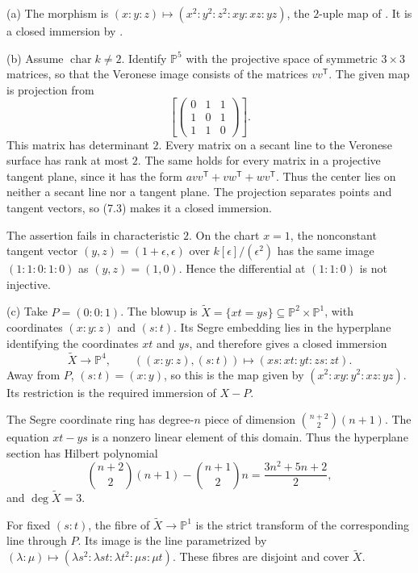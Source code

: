 (a) The morphism is $(x:y:z)\mapsto(x^2:y^2:z^2:xy:xz:yz)$, the $2$-uple map of . It is a closed immersion by .

(b) Assume $\operatorname{char}k\ne2$. Identify $\mathbb P^5$ with the projective space of symmetric $3\times3$ matrices, so that the Veronese image consists of the matrices $vv^{\mathsf T}$. The given map is projection from
\[\left[\begin{pmatrix}0&1&1\\1&0&1\\1&1&0\end{pmatrix}\right].\]
This matrix has determinant $2$. Every matrix on a secant line to the Veronese surface has rank at most $2$. The same holds for every matrix in a projective tangent plane, since it has the form $avv^{\mathsf T}+vw^{\mathsf T}+wv^{\mathsf T}$. Thus the center lies on neither a secant line nor a tangent plane. The projection separates points and tangent vectors, so (7.3) makes it a closed immersion.

The assertion fails in characteristic $2$. On the chart $x=1$, the nonconstant tangent vector $(y,z)=(1+\epsilon,\epsilon)$ over $k[\epsilon]/(\epsilon^2)$ has the same image $(1:1:0:1:0)$ as $(y,z)=(1,0)$. Hence the differential at $(1:1:0)$ is not injective.

(c) Take $P=(0:0:1)$. The blowup is $\widetilde X=\{xt=ys\}\subseteq\mathbb P^2\times\mathbb P^1$, with coordinates $(x:y:z)$ and $(s:t)$. Its Segre embedding lies in the hyperplane identifying the coordinates $xt$ and $ys$, and therefore gives a closed immersion
\[\widetilde X\to\mathbb P^4,\qquad ((x:y:z),(s:t))\mapsto(xs:xt:yt:zs:zt).\]
Away from $P$, $(s:t)=(x:y)$, so this is the map given by $(x^2:xy:y^2:xz:yz)$. Its restriction is the required immersion of $X-P$.

The Segre coordinate ring has degree-$n$ piece of dimension $\binom{n+2}{2}(n+1)$. The equation $xt-ys$ is a nonzero linear element of this domain. Thus the hyperplane section has Hilbert polynomial
\[\binom{n+2}{2}(n+1)-\binom{n+1}{2}n=\frac{3n^2+5n+2}{2},\]
and $\deg\widetilde X=3$.

For fixed $(s:t)$, the fibre of $\widetilde X\to\mathbb P^1$ is the strict transform of the corresponding line through $P$. Its image is the line parametrized by $(\lambda:\mu)\mapsto(\lambda s^2:\lambda st:\lambda t^2:\mu s:\mu t)$. These fibres are disjoint and cover $\widetilde X$.
